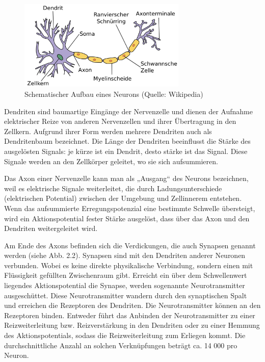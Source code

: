 \begin{figure}[h]
\centering
\includegraphics[width=8cm]{chapters/neural_networks/neuron.jpg}

\caption{Schematischer Aufbau eines Neurons (Quelle: Wikipedia)}
	\label{img:neuron}

\end{figure}
Dendriten sind baumartige Eingänge der Nervenzelle und dienen der Aufnahme elektrischer Reize von anderen Nervenzellen und ihrer Übertragung in den Zellkern. Aufgrund ihrer Form werden mehrere Dendriten auch als Dendritenbaum bezeichnet. Die Länge der Dendriten beeinflusst die Stärke des ausgelösten Signals: je kürze ist ein Dendrit, desto stärke ist das Signal. Diese Signale werden an den Zellkörper geleitet, wo sie sich aufsummieren.

Das Axon einer Nervenzelle kann man als „Ausgang“ des Neurons bezeichnen, weil es elektrische Signale weiterleitet, die durch Ladungsunterschiede (elektrischen Potential) zwischen der Umgebung und Zellinnerem entstehen. Wenn das aufsummierte Erregungspotenzial eine bestimmte Schwelle übersteigt, wird ein Aktionspotential fester Stärke ausgelöst, dass über das Axon und den Dendriten weitergeleitet wird.

Am Ende des Axons befinden sich die Verdickungen, die auch Synapsen genannt werden (siehe Abb. 2.2). Synapsen sind mit den Dendriten anderer Neuronen verbunden. Wobei es keine direkte physikalische Verbindung, sondern einen mit Flüssigkeit gefüllten Zwischenraum gibt. Erreicht ein über dem Schwellenwert liegendes Aktionspotential die Synapse, werden sogenannte Neurotransmitter ausgeschüttet. Diese Neurotransmitter wandern durch den synaptischen Spalt und erreichen die Rezeptoren des Dendriten. Die Neurotransmitter können an den Rezeptoren binden. Entweder führt das Anbinden der Neurotransmitter zu einer Reizweiterleitung bzw. Reizverstärkung in den Dendriten oder zu einer Hemmung des Aktionspotentials, sodass die Reizweiterleitung zum Erliegen kommt.  Die durchschnittliche Anzahl an solchen Verknüpfungen beträgt ca. 14 000 pro Neuron.

